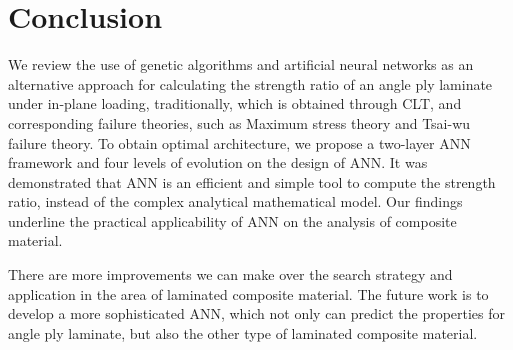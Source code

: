 \section{Conclusion}
We review the use of genetic algorithms and artificial neural networks as an
alternative approach for calculating the strength ratio of an angle ply
laminate under in-plane loading, traditionally, which is obtained through CLT,
and corresponding failure theories, such as Maximum stress theory and Tsai-wu
failure theory. To obtain optimal architecture, we propose a two-layer ANN
framework and four levels of evolution on the design of ANN.  It was
demonstrated that ANN is an efficient and simple tool to compute the strength
ratio, instead of the complex analytical mathematical model. Our findings
underline the practical applicability of ANN on the analysis of composite
material.  

There are more improvements we can make over the search strategy and
application in the area of laminated composite material. The future work is to
develop a more sophisticated ANN, which not only can predict the properties for
angle ply laminate, but also the other type of laminated composite material.

